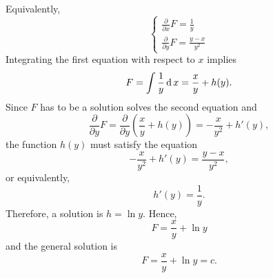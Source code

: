 \begin{solution}
\begin{enumerate}
		Equivalently, 
		\[
		\begin{cases}
		\frac{\partial}{\partial x} F  = \frac{1}{y}\\
		\frac{\partial}{\partial y} F  = \frac{y-x}{y^2}
		\end{cases}
		\]
		Integrating the first equation with respect to $x$ implies
		\[  
		F = \int \frac{1}{y} \operatorname{d} x  =\frac{x}{y} + h(y).
		\]
		Since $F$ has to be a solution solves the second equation and
		\[
		\frac{\partial}{\partial y} F = \frac{\partial}{\partial y}\left(\frac{x}{y} + h(y)\right) = -\frac{x}{y^2} + h'(y),
		\]
		the function $h(y)$ must satisfy the equation
		\[-\frac{x}{y^2} + h'(y) =\frac{y-x}{y^2},\]
		or equivalently,
		\[h'(y) =\frac1y.\]
		Therefore, a solution is $h=\ln y$. Hence, 
		\[F=\frac{x}{y}+\ln y\]
		and the general solution is 
		\[F=  \frac{x}{y} + \ln y=c.\]
	\end{enumerate}
\end{solution}

